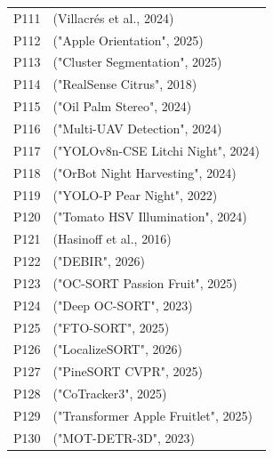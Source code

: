 \begin{tabular}{ll}
P111 & (Villacrés et al., 2024) \\
P112 & ("Apple Orientation", 2025) \\
P113 & ("Cluster Segmentation", 2025) \\
P114 & ("RealSense Citrus", 2018) \\
P115 & ("Oil Palm Stereo", 2024) \\
P116 & ("Multi-UAV Detection", 2024) \\
P117 & ("YOLOv8n-CSE Litchi Night", 2024) \\
P118 & ("OrBot Night Harvesting", 2024) \\
P119 & ("YOLO-P Pear Night", 2022) \\
P120 & ("Tomato HSV Illumination", 2024) \\
P121 & (Hasinoff et al., 2016) \\
P122 & ("DEBIR", 2026) \\
P123 & ("OC-SORT Passion Fruit", 2025) \\
P124 & ("Deep OC-SORT", 2023) \\
P125 & ("FTO-SORT", 2025) \\
P126 & ("LocalizeSORT", 2026) \\
P127 & ("PineSORT CVPR", 2025) \\
P128 & ("CoTracker3", 2025) \\
P129 & ("Transformer Apple Fruitlet", 2025) \\
P130 & ("MOT-DETR-3D", 2023) \\
\hline
\end{tabular}




